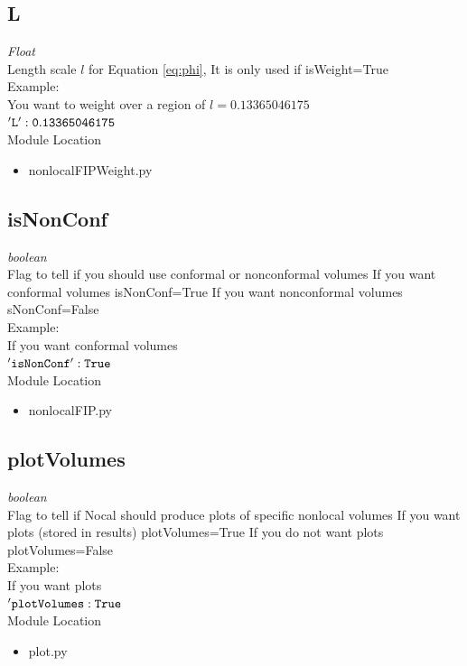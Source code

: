\documentclass[11pt]{article}
\newcommand{\Eq}{Equation }
\begin{document}
\subsection{L}
\emph{Float} \\
Length scale $l$ for \Eq \ref{eq:phi}, It is only used if isWeight=True\\
Example:\\
You want to weight over a region of $l=0.13365046175$\\
{$\tt{'L' : 0.13365046175}$}\\
Module Location\\
\begin{itemize}
  \item nonlocalFIPWeight.py
\end{itemize}
\subsection{isNonConf}
\emph{boolean} \\
Flag to tell if you should use conformal or nonconformal volumes
If you want conformal volumes isNonConf=True
If you want nonconformal volumes sNonConf=False \\
Example:\\
If you want conformal volumes \\
{$\tt{'isNonConf' : True}$}\\
Module Location\\
\begin{itemize}
  \item nonlocalFIP.py
\end{itemize}
\subsection{plotVolumes}
\emph{boolean} \\
Flag to tell if Nocal should produce plots of specific nonlocal volumes
If you want plots (stored in results) plotVolumes=True
If you do not want plots plotVolumes=False \\
Example:\\
If you want plots \\
{$\tt{'plotVolumes : True}$}\\
Module Location\\
\begin{itemize}
  \item plot.py
\end{itemize}
\end{document}

